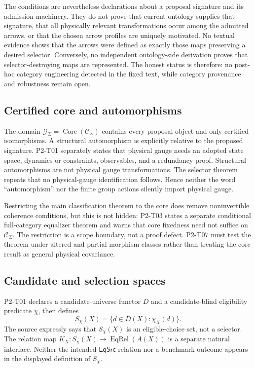 \documentclass[11pt]{article}
\newcommand{\G}{\mathcal G_{\Sigma}}
\newcommand{\C}{\mathcal C_{\Sigma}}
\newcommand{\Sch}{S_{\chi}}
\begin{document}
The conditions are nevertheless declarations about a proposal signature and
its admission machinery.  They do not prove that current ontology supplies
that signature, that all physically relevant transformations occur among the
admitted arrows, or that the chosen arrow profiles are uniquely motivated.
No textual evidence shows that the arrows were defined as exactly those maps
preserving a desired selector.  Conversely, no independent ontology-side
derivation proves that selector-destroying maps are represented.  The honest
status is therefore: no post-hoc category engineering detected in the fixed
text, while category provenance and robustness remain open.

\subsection{Certified core and automorphisms}

The domain \(\G=\operatorname{Core}(\C)\) contains every proposal object and
only certified isomorphisms.  A structural automorphism is explicitly relative
to the proposed signature.  P2-T01 separately states that physical gauge needs
an adopted state space, dynamics or constraints, observables, and a redundancy
proof.  Structural automorphisms are not physical gauge transformations.  The
selector theorem repeats that no physical-gauge identification
follows.  Hence neither the word ``automorphism'' nor the finite group actions
silently import physical gauge.

Restricting the main classification theorem to the core does remove
noninvertible coherence conditions, but this is not hidden: P2-T03 states a
separate conditional full-category equalizer theorem and warns that core
fixedness need not suffice on \(\C\).  The restriction is a scope boundary,
not a proof defect.  P2-T07 must test the theorem under altered and partial
morphism classes rather than treating the core result as general physical
covariance.

\subsection{Candidate and selection spaces}

P2-T01 declares a candidate-universe functor \(D\) and a candidate-blind
eligibility predicate \(\chi\), then defines
\[
  \Sch(X)=\{d\in D(X):\chi_X(d)\}.
\]
The source expressly says that \(\Sch(X)\) is an eligible-choice set, not a
selector.  The relation map \(K_X:\Sch(X)\to\operatorname{EqRel}(A(X))\) is a
separate natural interface.  Neither the intended \(\mathsf{EqSrc}\) relation
nor a benchmark outcome appears in the displayed definition of \(\Sch\).
\end{document}
